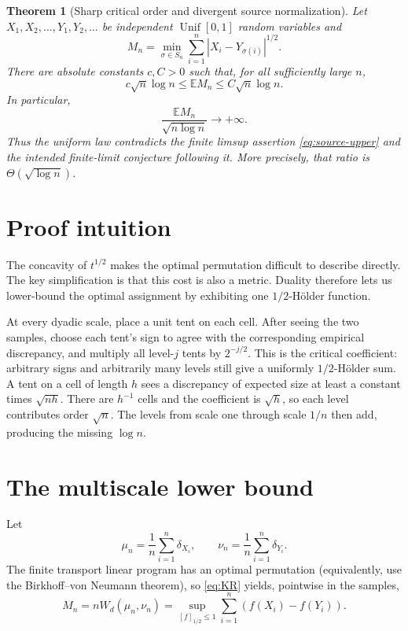 \documentclass[11pt]{article}
\newtheorem{theorem}{Theorem}
\newcommand{\E}{\mathbb E}
\newcommand{\Unif}{\operatorname{Unif}}
\begin{document}
\begin{theorem}[Sharp critical order and divergent source normalization]
\label{thm:main}
Let \(X_1,X_2,\ldots,Y_1,Y_2,\ldots\) be independent
\(\Unif[0,1]\) random variables and
\[
 M_n=\min_{\sigma\in S_n}\sum_{i=1}^n|X_i-Y_{\sigma(i)}|^{1/2}.
\]
There are absolute constants \(c,C>0\) such that, for all sufficiently large
\(n\),
\begin{equation}\label{eq:main-order}
 c\sqrt n\log n\le \E M_n\le C\sqrt n\log n.
\end{equation}
In particular,
\begin{equation}\label{eq:divergence}
 \frac{\E M_n}{\sqrt{n\log n}}\longrightarrow+\infty.
\end{equation}
Thus the uniform law contradicts the finite limsup assertion
\eqref{eq:source-upper} and the intended finite-limit conjecture following it.
More precisely, that ratio is \(\Theta(\sqrt{\log n})\).
\end{theorem}

\section{Proof intuition}

The concavity of \(t^{1/2}\) makes the optimal permutation difficult to
describe directly.  The key simplification is that this cost is also a metric.
Duality therefore lets us lower-bound the optimal assignment by exhibiting one
\(1/2\)-Hölder function.

At every dyadic scale, place a unit tent on each cell.  After seeing the two
samples, choose each tent's sign to agree with the corresponding empirical
discrepancy, and multiply all level-\(j\) tents by \(2^{-j/2}\).  This is the
critical coefficient: arbitrary signs and arbitrarily many levels still give
a uniformly \(1/2\)-Hölder sum.  A tent on a cell of length \(h\) sees a
discrepancy of expected size at least a constant times \(\sqrt{nh}\).  There
are \(h^{-1}\) cells and the coefficient is \(\sqrt h\), so each level
contributes order \(\sqrt n\).  The levels from scale one through scale
\(1/n\) then add, producing the missing \(\log n\).

\section{The multiscale lower bound}

Let
\[
 \mu_n=\frac1n\sum_{i=1}^n\delta_{X_i},\qquad
 \nu_n=\frac1n\sum_{i=1}^n\delta_{Y_i}.
\]
The finite transport linear program has an optimal permutation (equivalently,
use the Birkhoff--von Neumann theorem), so \eqref{eq:KR} yields, pointwise in
the samples,
\begin{equation}\label{eq:assignment-dual}
 M_n=nW_d(\mu_n,\nu_n)
 =\sup_{[f]_{1/2}\le1}\sum_{i=1}^n(f(X_i)-f(Y_i)).
\end{equation}
\end{document}
